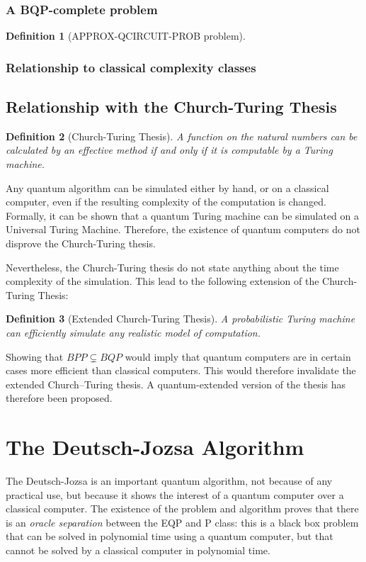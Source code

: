 \documentclass[12pt,a4paper]{article}
\newtheorem{definition}{Definition}
\begin{document}
\subsubsection{A BQP-complete problem}
\begin{definition}[APPROX-QCIRCUIT-PROB problem]
    
\end{definition}

\subsubsection{Relationship to classical complexity classes}


\subsection{Relationship with the Church-Turing Thesis}
\begin{definition}[Church-Turing Thesis]
    A function on the natural numbers can be calculated by an effective method if and only if it is computable by a Turing machine.
\end{definition}

Any quantum algorithm can be simulated either by hand, or on a classical computer, even if the resulting complexity of the computation is changed. Formally, it can be shown that a quantum Turing machine can be simulated on a Universal Turing Machine. Therefore, the existence of quantum computers do not disprove the Church-Turing thesis.

Nevertheless, the Church-Turing thesis do not state anything about the time complexity of the simulation. This lead to the following extension of the Church-Turing Thesis:
\begin{definition}[Extended Church-Turing Thesis]
    A probabilistic Turing machine can efficiently simulate any realistic model of computation.
\end{definition}
Showing that $BPP \varsubsetneq BQP$ would imply that quantum computers are in certain cases more efficient than classical computers. This would therefore invalidate the extended Church–Turing thesis. A quantum-extended version of the thesis has therefore been proposed. %

\section{The Deutsch-Jozsa Algorithm}
The Deutsch-Jozsa is an important quantum algorithm, not because of any practical use, but because it shows the interest of a quantum computer over a classical computer. The existence of the problem and algorithm proves that there is an \emph{oracle separation} between the EQP and P class: this is a black box problem that can be solved in polynomial time using a quantum computer, but that cannot be solved by a classical computer in polynomial time.
\end{document}
